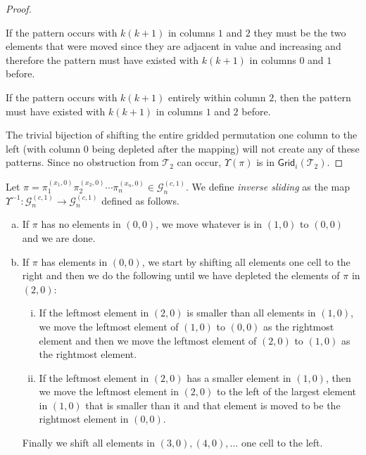 \begin{proof}
\begin{center}

\end{center}

If the pattern occurs with $k(k+1)$ in columns $1$ and $2$ they must be the two elements that were moved since they are adjacent in value and increasing and therefore the pattern must have existed with $k(k+1)$ in columns $0$ and $1$ before.

\begin{center}

\end{center}

If the pattern occurs with $k(k+1)$ entirely within column $2$, then the pattern must have existed with $k(k+1)$ in columns $1$ and $2$ before.

\begin{center}

\end{center}

The trivial bijection of shifting the entire gridded permutation one column to the left (with column $0$ being depleted after the mapping) will not create any of these patterns. Since no obstruction from $\mathcal{T}_2$ can occur, $\Upsilon(\pi)$ is in $\textsf{Grid}_i(\mathcal{T}_2)$.
\end{proof}

\begin{definition}
Let $\pi = \pi_1^{(x_1,0)}\pi_2^{(x_2,0)}\cdots\pi_n^{(x_n,0)} \in \mathcal{G}^{(c,1)}_n$. We define \emph{inverse sliding} as the map $\Upsilon^{-1}: \mathcal{G}^{(c,1)}_n \to \mathcal{G}^{(c,1)}_n$ defined as follows.
\begin{enumerate}[a)]
    \item If $\pi$ has no elements in $(0,0)$, we move whatever is in $(1,0)$ to $(0,0)$ and we are done.
    \item If $\pi$ has elements in $(0,0)$, we start by shifting all elements one cell to the right and then we do the following until we have depleted the elements of $\pi$ in $(2,0)$:
    \begin{enumerate}[i.]
        \item If the leftmost element in $(2,0)$ is smaller than all elements in $(1,0)$, we move the leftmost element of $(1,0)$ to $(0,0)$ as the rightmost element and then we move the leftmost element of $(2,0)$ to $(1,0)$ as the rightmost element.
        \item If the leftmost element in $(2,0)$ has a smaller element in $(1,0)$, then we move the leftmost element in $(2,0)$ to the left of the largest element in $(1,0)$ that is smaller than it and that element is moved to be the rightmost element in $(0,0)$.
    \end{enumerate}
    Finally we shift all elements in $(3,0), (4,0), \ldots$ one cell to the left.
\end{enumerate}
\end{definition}

